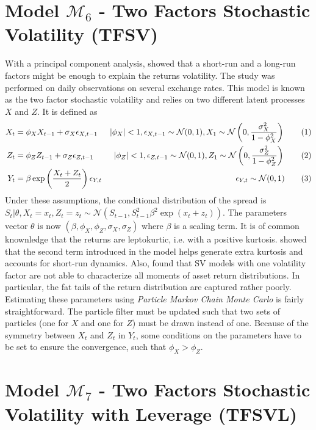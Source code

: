\documentclass[11pt,a4,twosided,singlespacing,titlepagenumber=on]{scrreprt}
\numberwithin{equation}{chapter} %
\theoremstyle{remark}
\newcommand\numberthis{\addtocounter{equation}{1}\tag{\theequation}}
\begin{document}
\section{Model $\mathcal{M}_6$ - Two Factors Stochastic Volatility (TFSV)}
With a principal component analysis, \cite{harvey1994} showed that a short-run and a long-run factors might be enough to explain the returns volatility. The study was performed on daily observations on several exchange rates. This model is known as the two factor stochastic volatility and relies on two different latent processes $X$ and $Z$. It is defined as
\begin{align*}
  X_t 						&=  \phi_X X_{t-1} + \sigma_X \epsilon_{X,t-1} &|\phi_X| < 1, \epsilon_{X,t-1} \sim \mathcal{N}(0,1), X_1 \sim \mathcal{N} \left(0, \frac{\sigma_X^2}{1 - \phi_X^2} \right) \numberthis \label{tfsv_process_X} \\
  Z_t 						&=  \phi_Z Z_{t-1} + \sigma_Z \epsilon_{Z,t-1} &|\phi_Z| < 1, \epsilon_{Z,t-1} \sim \mathcal{N}(0,1), Z_1 \sim \mathcal{N} \left(0, \frac{\sigma_Z^2}{1 - \phi_Z^2} \right) \numberthis\\
  Y_t 						&=  \beta \exp \left( \frac{X_t+Z_t}{2} \right) \epsilon_{Y,t} &\epsilon_{Y,t} \sim \mathcal{N}(0,1) \numberthis
\end{align*}
Under these assumptions, the conditional distribution of the spread is $S_t | \theta, X_t = x_t, Z_t = z_t \sim \mathcal{N}\left(S_{t-1}, S_{t-1}^2 \beta^2 \exp \left(x_t + z_t\right) \right)$. The parameters vector $\theta$ is now $(\beta, \phi_X, \phi_Z, \sigma_X, \sigma_Z)$ where $\beta$ is a scaling term. It is of common knownledge that the returns are leptokurtic, i.e. with a positive kurtosis. \cite{veiga2006} showed that the second term introduced in the model helps generate extra kurtosis and accounts for short-run dynamics. Also, \cite{chernov2000} found that SV models with one volatility factor are not able to characterize all moments of asset return distributions. In particular, the fat tails of the return distribution are captured rather poorly. \\
Estimating these parameters using \textit{Particle Markov Chain Monte Carlo} is fairly straightforward. The particle filter must be updated such that two sets of particles (one for $X$ and one for $Z$) must be drawn instead of one. Because of the symmetry between $X_t$ and $Z_t$ in $Y_t$, some conditions on the parameters have to be set to ensure the convergence, such that $\phi_X > \phi_Z$.

\section{Model $\mathcal{M}_7$ - Two Factors Stochastic Volatility with Leverage (TFSVL)}
\end{document}
